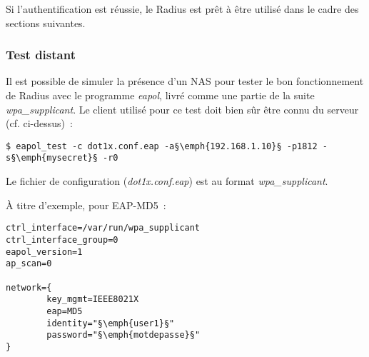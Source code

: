 Si l'authentification est réussie, le Radius est prêt à être utilisé dans le cadre des sections suivantes.

\subsubsection{Test distant}

Il est possible de simuler la présence d'un NAS pour tester le bon fonctionnement de Radius avec le programme \emph{eapol}, livré comme une partie de la suite \emph{wpa\_supplicant}. Le client utilisé pour ce test doit bien sûr être connu du serveur (cf. ci-dessus)~:

\begin{lstlisting}
$ eapol_test -c dot1x.conf.eap -a§\emph{192.168.1.10}§ -p1812 -s§\emph{mysecret}§ -r0
\end{lstlisting} 

Le fichier de configuration (\emph{dot1x.conf.eap}) est au format \emph{wpa\_supplicant}.

À titre d'exemple, pour EAP-MD5~:

\begin{lstlisting}
ctrl_interface=/var/run/wpa_supplicant
ctrl_interface_group=0
eapol_version=1
ap_scan=0

network={
        key_mgmt=IEEE8021X
        eap=MD5
        identity="§\emph{user1}§"
        password="§\emph{motdepasse}§"
}
\end{lstlisting}
